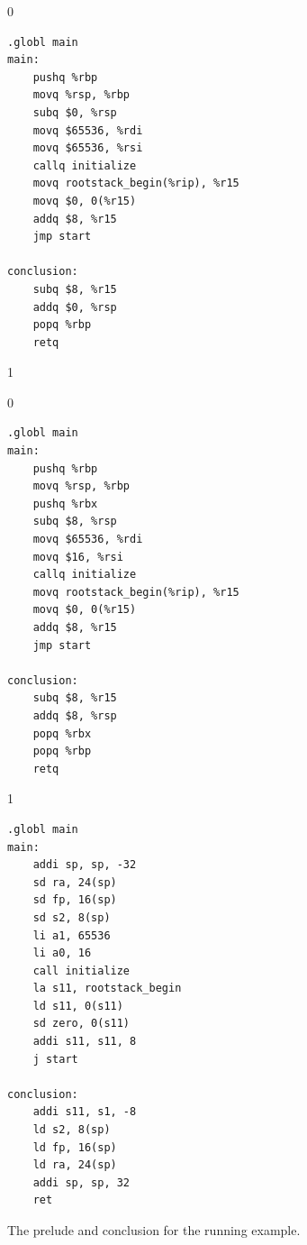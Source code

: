 \documentclass[7x10]{TimesAPriori_MIT}%
\def\racketEd{0}
\def\pythonEd{1}
\def\edition{1}
\def\xeightysixEd{0}
\def\riscvEd{1}
\def\architecture{1}
\numberwithin{theorem}{chapter}
\numberwithin{definition}{chapter}
\numberwithin{equation}{chapter}
\begin{document}
\begin{figure}[htbp]
  \begin{tcolorbox}[colback=white]
{\if\edition\racketEd    
\begin{minipage}[t]{0.5\textwidth}
\begin{lstlisting}[basicstyle=\ttfamily\footnotesize]
	.globl main
main:
    pushq %rbp
    movq %rsp, %rbp
    subq $0, %rsp
    movq $65536, %rdi
    movq $65536, %rsi
    callq initialize
    movq rootstack_begin(%rip), %r15
    movq $0, 0(%r15)
    addq $8, %r15
    jmp start
    
conclusion:
    subq $8, %r15
    addq $0, %rsp
    popq %rbp
    retq
\end{lstlisting}
\end{minipage}
    \fi}
{\if\edition\pythonEd    
{\if\architecture\xeightysixEd
\begin{minipage}[t]{0.5\textwidth}
\begin{lstlisting}[basicstyle=\ttfamily\footnotesize]
    .globl main
main:
    pushq %rbp
    movq %rsp, %rbp
    pushq %rbx
    subq $8, %rsp
    movq $65536, %rdi
    movq $16, %rsi
    callq initialize
    movq rootstack_begin(%rip), %r15
    movq $0, 0(%r15)
    addq $8, %r15
    jmp start

conclusion:
    subq $8, %r15
    addq $8, %rsp
    popq %rbx
    popq %rbp
    retq 
\end{lstlisting}
\end{minipage}
\fi}
{\if\architecture\riscvEd
\begin{minipage}[t]{0.5\textwidth}
\begin{lstlisting}[basicstyle=\ttfamily\footnotesize]
    .globl main
main:
    addi sp, sp, -32
    sd ra, 24(sp)
    sd fp, 16(sp)
    sd s2, 8(sp)
    li a1, 65536
    li a0, 16
    call initialize
    la s11, rootstack_begin
    ld s11, 0(s11)
    sd zero, 0(s11)
    addi s11, s11, 8
    j start

conclusion:
    addi s11, s1, -8
    ld s2, 8(sp)
    ld fp, 16(sp)
    ld ra, 24(sp)
    addi sp, sp, 32
    ret
\end{lstlisting}
\end{minipage}
\fi}
\fi}
  \end{tcolorbox}

  \caption{The prelude and conclusion for the running example.}
\label{fig:print-x86-output-gc}
\end{figure}
\end{document}
